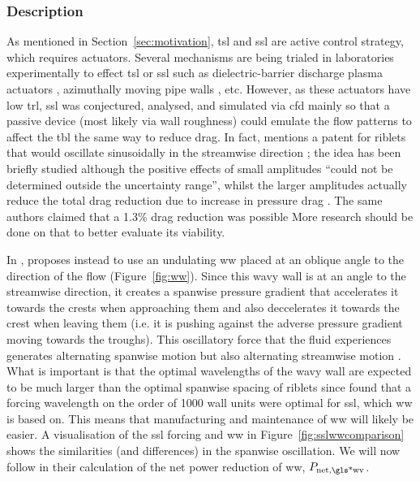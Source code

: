 \subsubsection{Description}
As mentioned in Section~\ref{sec:motivation}, \gls*{tsl} and \gls*{ssl} are active control strategy, which requires actuators. Several mechanisms are being trialed in laboratories experimentally to effect \gls*{tsl} or \gls*{ssl} such as dielectric-barrier discharge plasma actuators \cite{choi2011}, azimuthally moving pipe walls \cite{auteri2010}, etc. However, as these actuators have low \gls*{trl}, \gls*{ssl} was conjectured, analysed, and simulated via \gls*{cfd} mainly so that a passive device (most likely via wall roughness) could emulate the flow patterns to affect the \gls*{tbl} the same way to reduce drag. In fact, \textcite{viotti2009} mentions a patent for riblets that would oscillate sinusoidally in the streamwise direction \cite{quadrio2008}; the idea has been briefly studied although the positive effects of small amplitudes ``could not be determined outside the uncertainty range'', whilst the larger amplitudes actually reduce the total drag reduction due to increase in pressure drag \cite{kramer2010}. The same authors claimed that a 1.3\% drag reduction was possible \cite{gruneberger2012}  More research should be done on that to better evaluate its viability.

In \cite{chernyshenko2013}, \citeauthor{chernyshenko2013} proposes instead to use an undulating \gls*{ww} placed at an oblique angle to the direction of the flow (Figure~\ref{fig:ww}). Since this wavy wall is at an angle to the streamwise direction, it creates a spanwise pressure gradient that accelerates it towards the crests when approaching them and also deccelerates it towards the crest when leaving them (i.e. it is pushing against the adverse pressure gradient moving towards the troughs). This oscillatory force that the fluid experiences generates alternating spanwise motion but also alternating streamwise motion \cite{ghebali2017}. What is important is that the optimal wavelengths of the wavy wall are expected to be much larger than the optimal spanwise spacing of riblets since \textcite{viotti2009} found that a forcing wavelength on the order of 1000 wall units were optimal for \gls*{ssl}, which \gls*{ww} is based on. This means that manufacturing and maintenance of \gls*{ww} will likely be easier. A visualisation of the \gls*{ssl} forcing and \gls*{ww} in Figure~\ref{fig:sslwwcomparison} shows the similarities (and differences) in the spanwise oscillation. We will now follow \textcite{chernyshenko2013} in their calculation of the net power reduction of \gls*{ww}, $P_\text{net,\gls*{wv}} $.

